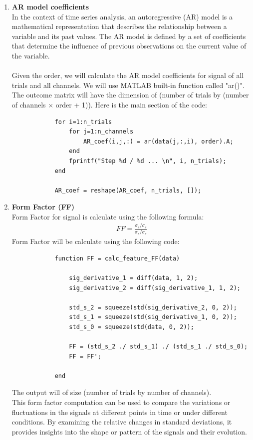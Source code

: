 \documentclass[]{article}
\begin{document}
\begin{enumerate}
\begin{lstlisting}
			result = reshape(result, n_trials, []);
		\end{lstlisting}
	
		\item \textbf{AR model coefficients}\\
		In the context of time series analysis, an autoregressive (AR) model is a mathematical representation that describes the relationship between a variable and its past values. The AR model is defined by a set of coefficients that determine the influence of previous observations on the current value of the variable. \\\\
		Given the order, we will calculate the AR model coefficients for signal of all trials and all channels. We will use MATLAB built-in function called "ar()". The outcome matrix will have the dimension of (number of trials by (number of channels $\times$ order + 1)). Here is the main section of the code:
		\begin{lstlisting}
			for i=1:n_trials
				for j=1:n_channels
					AR_coef(i,j,:) = ar(data(j,:,i), order).A;
				end
				fprintf("Step %d / %d ... \n", i, n_trials);
			end
			
			AR_coef = reshape(AR_coef, n_trials, []);
		\end{lstlisting}
	
		\item \textbf{Form Factor (FF)}\\
		Form Factor for signal is calculate using the following formula:
		\begin{align*}
			FF = \frac{\sigma_{\ddot{s}} / \sigma_{\dot{s}}}{\sigma_{\dot{s}} / \sigma_{s}}
		\end{align*}
		Form Factor will be calculate using the following code:
		\begin{lstlisting}
			function FF = calc_feature_FF(data)
			
				sig_derivative_1 = diff(data, 1, 2);
				sig_derivative_2 = diff(sig_derivative_1, 1, 2);
				
				std_s_2 = squeeze(std(sig_derivative_2, 0, 2));
				std_s_1 = squeeze(std(sig_derivative_1, 0, 2));
				std_s_0 = squeeze(std(data, 0, 2));
				
				FF = (std_s_2 ./ std_s_1) ./ (std_s_1 ./ std_s_0);
				FF = FF';
				
			end
		\end{lstlisting}
		The output will of size (number of trials by number of channels).\\
		This form factor computation can be used to compare the variations or fluctuations in the signals at different points in time or under different conditions. By examining the relative changes in standard deviations, it provides insights into the shape or pattern of the signals and their evolution.
		

\end{enumerate}
\end{document}
